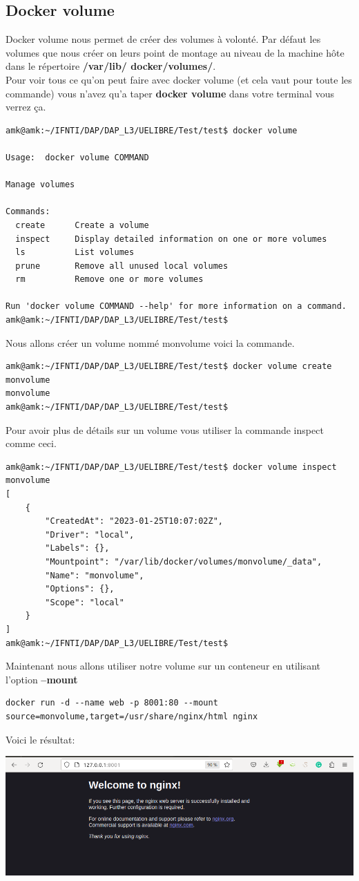 \documentclass[12pt,a4paper]{article}
\begin{document}
\subsection{Docker volume}
Docker volume nous permet de créer des volumes à volonté. Par
défaut les volumes que nous créer on leurs point de montage au
niveau de la machine hôte dans le répertoire \textbf{/var/lib/
docker/volumes/}.\\
Pour voir tous ce qu'on peut faire avec docker volume (et cela vaut
pour toute les commande) vous n'avez
qu'a taper \textbf{docker volume} dans votre terminal vous verrez
ça.
\begin{verbatim}
amk@amk:~/IFNTI/DAP/DAP_L3/UELIBRE/Test/test$ docker volume 

Usage:  docker volume COMMAND

Manage volumes

Commands:
  create      Create a volume
  inspect     Display detailed information on one or more volumes
  ls          List volumes
  prune       Remove all unused local volumes
  rm          Remove one or more volumes

Run 'docker volume COMMAND --help' for more information on a command.
amk@amk:~/IFNTI/DAP/DAP_L3/UELIBRE/Test/test$ 

\end{verbatim}
Nous allons créer un volume nommé monvolume voici la commande.
\begin{verbatim}
amk@amk:~/IFNTI/DAP/DAP_L3/UELIBRE/Test/test$ docker volume create monvolume
monvolume
amk@amk:~/IFNTI/DAP/DAP_L3/UELIBRE/Test/test$ 
\end{verbatim}
Pour avoir plus de détails sur un volume vous utiliser la commande
inspect comme ceci.
\begin{verbatim}
amk@amk:~/IFNTI/DAP/DAP_L3/UELIBRE/Test/test$ docker volume inspect monvolume 
[
    {
        "CreatedAt": "2023-01-25T10:07:02Z",
        "Driver": "local",
        "Labels": {},
        "Mountpoint": "/var/lib/docker/volumes/monvolume/_data",
        "Name": "monvolume",
        "Options": {},
        "Scope": "local"
    }
]
amk@amk:~/IFNTI/DAP/DAP_L3/UELIBRE/Test/test$ 
\end{verbatim}
Maintenant nous allons utiliser notre volume sur un conteneur en
utilisant l'option \textbf{--mount}
\begin{verbatim}
docker run -d --name web -p 8001:80 --mount source=monvolume,target=/usr/share/nginx/html nginx
\end{verbatim}
Voici le résultat:
\begin{center}
\includegraphics[scale=0.3]{img/docker_volume_init.png}
\end{center}
\end{document}
